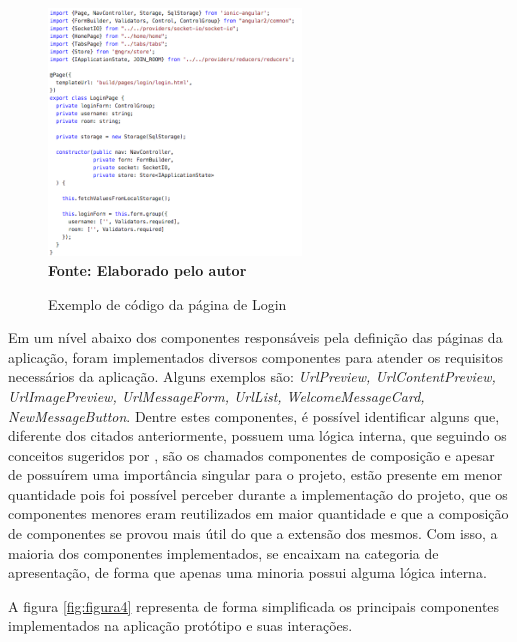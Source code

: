 \begin{figure}[ht]
	\centering	
	\caption[\hspace{0.1cm}Exemplo de código da página de Login.]{Exemplo de código da página de Login}
	\vspace{-0.4cm}
	\includegraphics[width=0.6\textwidth]{figuras/CodigoLogin.png}
	\vspace{-0.2cm}
	\\\textbf{\footnotesize Fonte: Elaborado pelo autor }
	\label{fig:figura3}
\end{figure}

Em um nível abaixo dos componentes responsáveis pela definição das páginas da aplicação, foram implementados diversos componentes para atender os requisitos necessários da aplicação. Alguns exemplos são: \textit{UrlPreview, UrlContentPreview, UrlImagePreview, UrlMessageForm, UrlList, WelcomeMessageCard, NewMessageButton}. Dentre estes componentes, é possível identificar alguns que, diferente dos citados anteriormente, possuem uma lógica interna, que seguindo os conceitos sugeridos por \cite{presentContainerAbramov}, são os chamados componentes de composição e apesar de possuírem uma importância singular para o projeto, estão presente em menor quantidade pois foi possível perceber durante a implementação do projeto, que os componentes menores eram reutilizados em maior quantidade e que a composição de componentes se provou mais útil do que a extensão dos mesmos. Com isso, a maioria dos componentes implementados, se encaixam na categoria de apresentação, de forma que apenas uma minoria possui alguma lógica interna. 

A figura \ref{fig:figura4} representa de forma simplificada os principais componentes implementados na aplicação protótipo e suas interações.

